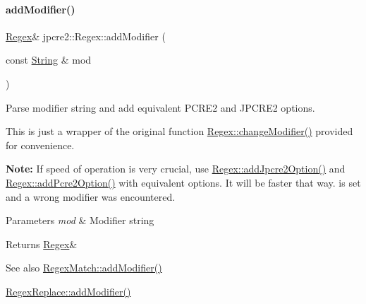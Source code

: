 \paragraph{\texorpdfstring{add\+Modifier()}{addModifier()}}
{\footnotesize\ttfamily \hyperlink{classjpcre2_1_1Regex}{Regex}\& jpcre2\+::\+Regex\+::add\+Modifier (\begin{DoxyParamCaption}\item[{const \hyperlink{namespacejpcre2_a91f03070152fb228bc116c5a737f1d16}{String} \&}]{mod }\end{DoxyParamCaption})\hspace{0.3cm}{\ttfamily [inline]}}



Parse modifier string and add equivalent P\+C\+R\+E2 and J\+P\+C\+R\+E2 options. 

This is just a wrapper of the original function \hyperlink{classjpcre2_1_1Regex_a9ab3efed9819a51225456e6d8487de56_a9ab3efed9819a51225456e6d8487de56}{Regex\+::change\+Modifier()} provided for convenience.

{\bfseries Note\+:} If speed of operation is very crucial, use \hyperlink{classjpcre2_1_1Regex_a03974fa7ba8f7c47186cb8d6f54934de_a03974fa7ba8f7c47186cb8d6f54934de}{Regex\+::add\+Jpcre2\+Option()} and \hyperlink{classjpcre2_1_1Regex_a2c7dcf12f26b2b046e147b013c8b5087_a2c7dcf12f26b2b046e147b013c8b5087}{Regex\+::add\+Pcre2\+Option()} with equivalent options. It will be faster that way. is set and a wrong modifier was encountered. 
\begin{DoxyParams}{Parameters}
{\em mod} & Modifier string \\
\hline
\end{DoxyParams}
\begin{DoxyReturn}{Returns}
\hyperlink{classjpcre2_1_1Regex}{Regex}\& 
\end{DoxyReturn}
\begin{DoxySeeAlso}{See also}
\hyperlink{classjpcre2_1_1RegexMatch_a08c2e481fe8b9c001e67733fb4e33972_a08c2e481fe8b9c001e67733fb4e33972}{Regex\+Match\+::add\+Modifier()} 

\hyperlink{classjpcre2_1_1RegexReplace_a06a57430f62058822d48722a2a6425d7_a06a57430f62058822d48722a2a6425d7}{Regex\+Replace\+::add\+Modifier()} 
\end{DoxySeeAlso}
\hypertarget{classjpcre2_1_1Regex_a2c7dcf12f26b2b046e147b013c8b5087_a2c7dcf12f26b2b046e147b013c8b5087}{}\label{classjpcre2_1_1Regex_a2c7dcf12f26b2b046e147b013c8b5087_a2c7dcf12f26b2b046e147b013c8b5087} 
